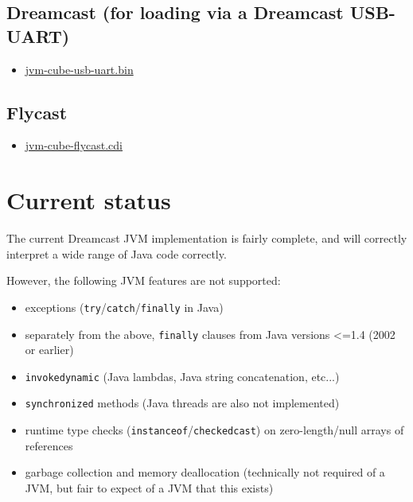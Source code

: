 \documentclass[20pt]{article}
\begin{document}
\subsection{Dreamcast (for loading via a Dreamcast USB-UART)}
\begin{itemize}
\item \href{https://dreamcast.idk.st/jvm/jvm-cube-usb-uart.bin}{jvm-cube-usb-uart.bin}
\end{itemize}

\subsection{Flycast}
\begin{itemize}
\item \href{https://dreamcast.idk.st/jvm/jvm-cube-flycast.cdi}{jvm-cube-flycast.cdi}
\end{itemize}

\section{Current status}

The current Dreamcast JVM implementation is fairly complete, and will correctly
interpret a wide range of Java code correctly.

However, the following JVM features are not supported:

\begin{itemize}
\item exceptions (\texttt{try}/\texttt{catch}/\texttt{finally} in Java)

\item separately from the above, \texttt{finally} clauses from Java versions <=1.4 (2002 or
  earlier)

\item \texttt{invokedynamic} (Java lambdas, Java string concatenation, etc...)

\item \texttt{synchronized} methods (Java threads are also not implemented)

\item runtime type checks (\texttt{instanceof}/\texttt{checkedcast}) on
  zero-length/null arrays of references

\item garbage collection and memory deallocation (technically not required of a
  JVM, but fair to expect of a JVM that this exists)
\end{itemize}
\end{document}
